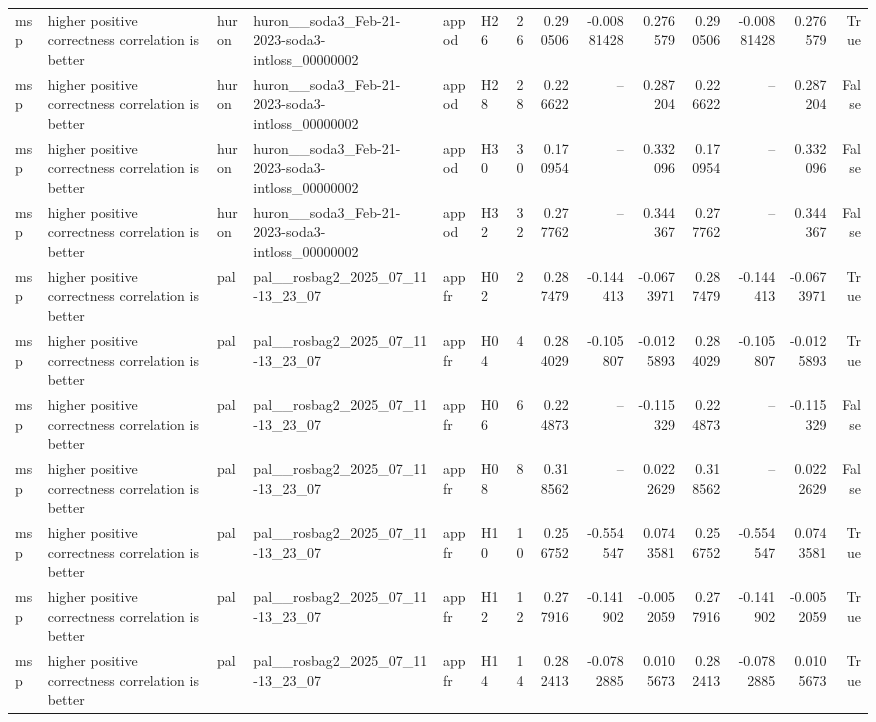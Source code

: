 \begin{longtable}{llllllrrrrrrrr}
msp & higher positive correctness correlation is better & huron & huron\_\_soda3\_Feb-21-2023-soda3-intloss\_00000002 & appod & H26 & 26 & 0.290506 & -0.00881428 & 0.276579 & 0.290506 & -0.00881428 & 0.276579 & True \\
msp & higher positive correctness correlation is better & huron & huron\_\_soda3\_Feb-21-2023-soda3-intloss\_00000002 & appod & H28 & 28 & 0.226622 & -- & 0.287204 & 0.226622 & -- & 0.287204 & False \\
msp & higher positive correctness correlation is better & huron & huron\_\_soda3\_Feb-21-2023-soda3-intloss\_00000002 & appod & H30 & 30 & 0.170954 & -- & 0.332096 & 0.170954 & -- & 0.332096 & False \\
msp & higher positive correctness correlation is better & huron & huron\_\_soda3\_Feb-21-2023-soda3-intloss\_00000002 & appod & H32 & 32 & 0.277762 & -- & 0.344367 & 0.277762 & -- & 0.344367 & False \\
msp & higher positive correctness correlation is better & pal & pal\_\_rosbag2\_2025\_07\_11-13\_23\_07 & appfr & H02 & 2 & 0.287479 & -0.144413 & -0.0673971 & 0.287479 & -0.144413 & -0.0673971 & True \\
msp & higher positive correctness correlation is better & pal & pal\_\_rosbag2\_2025\_07\_11-13\_23\_07 & appfr & H04 & 4 & 0.284029 & -0.105807 & -0.0125893 & 0.284029 & -0.105807 & -0.0125893 & True \\
msp & higher positive correctness correlation is better & pal & pal\_\_rosbag2\_2025\_07\_11-13\_23\_07 & appfr & H06 & 6 & 0.224873 & -- & -0.115329 & 0.224873 & -- & -0.115329 & False \\
msp & higher positive correctness correlation is better & pal & pal\_\_rosbag2\_2025\_07\_11-13\_23\_07 & appfr & H08 & 8 & 0.318562 & -- & 0.0222629 & 0.318562 & -- & 0.0222629 & False \\
msp & higher positive correctness correlation is better & pal & pal\_\_rosbag2\_2025\_07\_11-13\_23\_07 & appfr & H10 & 10 & 0.256752 & -0.554547 & 0.0743581 & 0.256752 & -0.554547 & 0.0743581 & True \\
msp & higher positive correctness correlation is better & pal & pal\_\_rosbag2\_2025\_07\_11-13\_23\_07 & appfr & H12 & 12 & 0.277916 & -0.141902 & -0.0052059 & 0.277916 & -0.141902 & -0.0052059 & True \\
msp & higher positive correctness correlation is better & pal & pal\_\_rosbag2\_2025\_07\_11-13\_23\_07 & appfr & H14 & 14 & 0.282413 & -0.0782885 & 0.0105673 & 0.282413 & -0.0782885 & 0.0105673 & True \\

\end{longtable}
